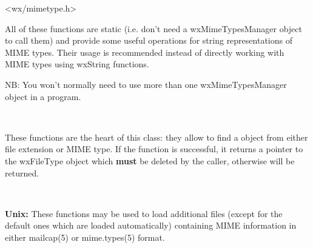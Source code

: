 <wx/mimetype.h>





\label{mimehelperfunctions}

All of these functions are static (i.e. don't need a wxMimeTypesManager object
to call them) and provide some useful operations for string representations of
MIME types. Their usage is recommended instead of directly working with MIME
types using wxString functions.



\label{mimeconstructordestructor}

NB: You won't normally need to use more than one wxMimeTypesManager object in a
program.

\\


\label{mimequerydatabase}

These functions are the heart of this class: they allow to find a  object
from either file extension or MIME type.
If the function is successful, it returns a pointer to the wxFileType object
which {\bf must} be deleted by the caller, otherwise \NULL will be returned.

\\


\label{wxmimetypesmanagerinit}

{\bf Unix:} These functions may be used to load additional files (except for the
default ones which are loaded automatically) containing MIME
information in either mailcap(5) or mime.types(5) format.

\\
\\



